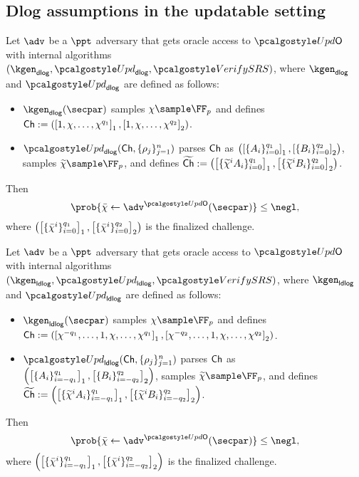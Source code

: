 {\subsection{Dlog assumptions in the updatable setting}
\label{sec:udlog_assumptions}
\begin{definition}\label{def:udlog}
	Let $\adv$ be a $\ppt$ adversary that gets oracle access to $\initU$ with internal algorithms $(\kgen_{\dlog}, \upd_{\dlog}, \verifyCRS)$, where $\kgen_{\dlog}$ and $\upd_{\dlog}$ are defined as follows:
	\begin{itemize}
	\item $\kgen_\dlog(\secpar)$ samples $\chi \sample \FF_p$ and defines 
		$\mathsf{Ch}:=(\left[1, \chi, \ldots,
			\chi^{q_1}\right]_{1}, \left[1, \chi, \ldots, \chi^{q_2}
		\right]_{2})$.
	\item $\upd_\dlog(\Ch, \{\rho_j \}_{j=1}^n)$ 
	parses $\mathsf{Ch}$ as $\left( \left[\{A_i\}_{i = 0}^{q_1}\right]_{1},
	\left[\{B_i\}_{i = 0}^{q_2}\right]_{2} \right)$, samples
	$\widetilde{\chi} \sample \FF_p$, and defines
	$\widetilde{\mathsf{Ch}} := 
	\left( \left[\{\widetilde{\chi}^i A_i\}_{i = 0}^{q_1}\right]_{1},
	\left[\{\widetilde{\chi}^i B_i\}_{i = 0}^{q_2}\right]_{2} \right)$.
	\end{itemize}
	Then
	\[
	\prob{\bar{\chi} \gets \adv^{\initU}(\secpar)} \leq \negl,
	\]
	where $\left( \left[\{\bar{\chi}^i\}_{i = 0}^{q_1}\right]_{1},
	\left[\{\bar{\chi}^i\}_{i = 0}^{q_2}\right]_{2} \right)$ is the finalized challenge.
\end{definition}

\begin{definition}\label{def:uldlog}
	Let $\adv$ be a $\ppt$ adversary that gets oracle access to $\initU$ with internal algorithms $(\kgen_{\ldlog}, \upd_{\ldlog}, \verifyCRS)$, where $\kgen_{\ldlog}$ and $\upd_{\ldlog}$ are defined as follows:
	\begin{itemize}
		\item $\kgen_\ldlog(\secpar)$ samples $\chi \sample \FF_p$ and defines 
		$\mathsf{Ch}:=(\left[\chi^{-q_1}, \ldots, 1, \chi, \ldots,
			\chi^{q_1}\right]_{1}, \left[\chi^{-q_2}, \ldots, 1, \chi, \ldots, \chi^{q_2}
		\right]_{2})$.
		\item $\upd_\ldlog(\Ch, \{\rho_j \}_{j=1}^n)$ 
		parses $\mathsf{Ch}$ as $\left( \left[\{A_i\}_{i = -q_1}^{q_1}\right]_{1},
		\left[\{B_i\}_{i = -q_2}^{q_2}\right]_{2} \right)$, samples
		$\widetilde{\chi} \sample \FF_p$, and defines
		$\widetilde{\mathsf{Ch}} := 
		\left( \left[\{\widetilde{\chi}^i A_i\}_{i = -q_1}^{q_1}\right]_{1},
		\left[\{\widetilde{\chi}^i B_i\}_{i = -q_2}^{q_2}\right]_{2} \right)$.
	\end{itemize}
	Then
	\[
	\prob{\bar{\chi} \gets \adv^{\initU}(\secpar)} \leq \negl,
	\]
	where $\left( \left[\{\bar{\chi}^i\}_{i = -q_1}^{q_1}\right]_{1},
	\left[\{\bar{\chi}^i\}_{i = -q_2}^{q_2}\right]_{2} \right)$ is the finalized challenge.
\end{definition}

}
